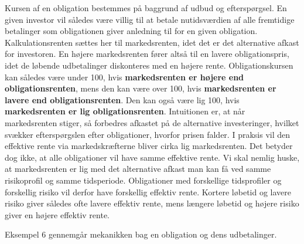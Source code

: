 \documentclass[10pt,reqno, usenames]{article}
\begin{document}
Kursen af en obligation bestemmes på baggrund af udbud og efterspørgsel. En given investor vil således være villig til at betale nutidsværdien af alle fremtidige betalinger som obligationen giver anledning til for en given obligation. Kalkulationsrenten sættes her til markedsrenten, idet det er det alternative afkast for investoren. En højere markedsrenten fører altså til en lavere obligationspris, idet de løbende udbetalinger diskonteres med en højere rente. Obligationskursen kan således være under 100, hvis \textbf{markedsrenten er højere end obligationsrenten}, mens den kan være over 100, hvis \textbf{markedsrenten er lavere end obligationsrenten}. Den kan også være lig 100, hvis \textbf{markedsrenten er lig obligationsrenten}. Intuitionen er, at når markedsrenten stiger, så forbedres afkastet på de alternative investeringer, hvilket svækker efterspørgslen efter obligationer, hvorfor prisen falder. I praksis vil den effektive rente via markedskræfterne bliver cirka lig markedsrenten. Det betyder dog ikke, at alle obligationer vil have samme effektive rente. Vi skal nemlig huske, at markedsrenten er lig med det alternative afkast man kan få ved samme risikoprofil og samme tidsperiode. Obligationer med forskellige tidsprofiler og forskellig risiko vil derfor have forskellig effektiv rente. Kortere løbetid og lavere risiko giver således ofte lavere effektiv rente, mens længere løbetid og højere risiko giver en højere effektiv rente. 

\vspace{10 pt}

Eksempel 6 gennemgår mekanikken bag en obligation og dens udbetalinger. 
\end{document}
